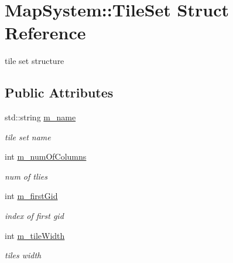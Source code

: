\hypertarget{struct_map_system_1_1_tile_set}{}\section{Map\+System\+:\+:Tile\+Set Struct Reference}
\label{struct_map_system_1_1_tile_set}


tile set structure  


\subsection*{Public Attributes}
\begin{DoxyCompactItemize}
\item 
\mbox{\label{struct_map_system_1_1_tile_set_aa929a0f8b65344cffd9544edf02e6f55}} 
std\+::string \mbox{\hyperlink{struct_map_system_1_1_tile_set_aa929a0f8b65344cffd9544edf02e6f55}{m\+\_\+name}}
\begin{DoxyCompactList}\small\item\em tile set name \end{DoxyCompactList}\item 
int \mbox{\hyperlink{struct_map_system_1_1_tile_set_a1c67e4f5e20a8cc2d87523cf772c8ee7}{m\+\_\+num\+Of\+Columns}}
\begin{DoxyCompactList}\small\item\em num of tlies \end{DoxyCompactList}\item 
\mbox{\label{struct_map_system_1_1_tile_set_a58270f3fd6878d89255ec927b7e7ae5d}} 
int \mbox{\hyperlink{struct_map_system_1_1_tile_set_a58270f3fd6878d89255ec927b7e7ae5d}{m\+\_\+first\+Gid}}
\begin{DoxyCompactList}\small\item\em index of first gid \end{DoxyCompactList}\item 
\mbox{\label{struct_map_system_1_1_tile_set_aba49748cab46f5b3ee9ba9f00d6c7ed1}} 
int \mbox{\hyperlink{struct_map_system_1_1_tile_set_aba49748cab46f5b3ee9ba9f00d6c7ed1}{m\+\_\+tile\+Width}}
\begin{DoxyCompactList}\small\item\em tiles width \end{DoxyCompactList}\item 

\end{DoxyCompactItemize}
